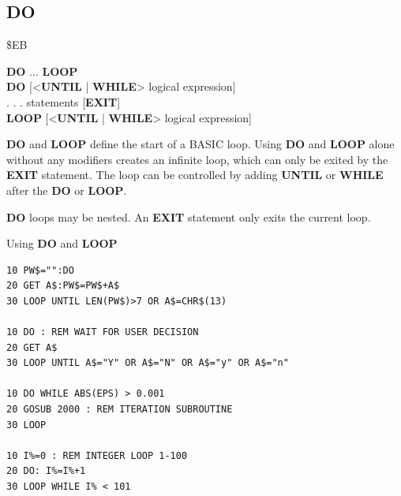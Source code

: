\subsection{DO}
\begin{description}[leftmargin=2cm,style=nextline]
\item [Token:] \$EB
\item [Format:] {\bf DO} ... {\bf LOOP} \\
                {\bf DO} [<{\bf UNTIL} | {\bf WHILE}> logical expression] \\
                . . . statements [{\bf EXIT}] \\
                {\bf LOOP} [<{\bf UNTIL} | {\bf WHILE}> logical expression]
\item [Usage:] {\bf DO} and {\bf LOOP} define
               the start of a BASIC loop.
               Using {\bf DO} and {\bf LOOP} alone without any
               modifiers creates an infinite loop, which can only be exited
               by the {\bf EXIT} statement. The loop can be
               controlled by adding {\bf UNTIL} or {\bf WHILE}
               after the {\bf DO} or {\bf LOOP}.

\item [Remarks:] {\bf DO} loops may be nested. An {\bf EXIT} statement
               only exits the current loop.
\item [Examples:] Using {\bf DO} and {\bf LOOP}
\begin{tcolorbox}[colback=black,coltext=white]
\verbatimfont{\codefont}
\begin{verbatim}
10 PW$="":DO
20 GET A$:PW$=PW$+A$
30 LOOP UNTIL LEN(PW$)>7 OR A$=CHR$(13)

10 DO : REM WAIT FOR USER DECISION
20 GET A$
30 LOOP UNTIL A$="Y" OR A$="N" OR A$="y" OR A$="n"

10 DO WHILE ABS(EPS) > 0.001
20 GOSUB 2000 : REM ITERATION SUBROUTINE
30 LOOP

10 I%=0 : REM INTEGER LOOP 1-100
20 DO: I%=I%+1
30 LOOP WHILE I% < 101
\end{verbatim}
\end{tcolorbox}
\end{description}


\newpage
